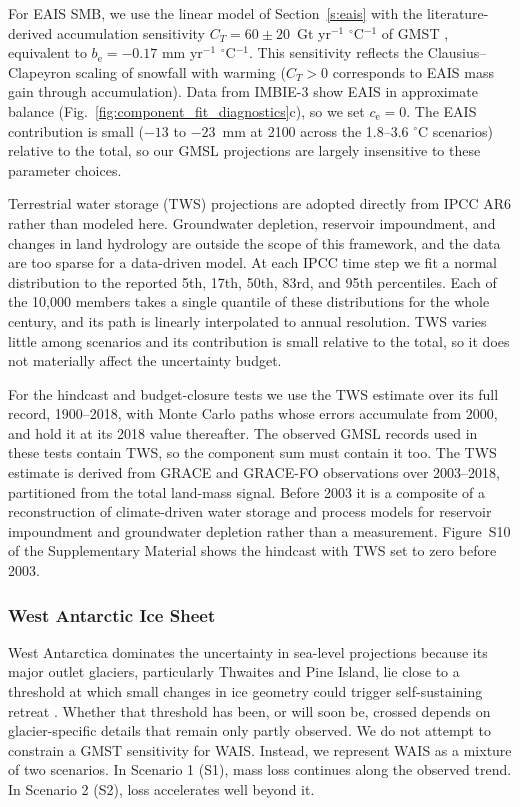 \documentclass[draft,linenumbers]{agujournal2025}
\begin{document}
For EAIS SMB, we use the linear model of Section~\ref{s:eais} with the literature-derived accumulation sensitivity $C_T = 60 \pm 20$~Gt yr$^{-1}$ $^\circ$C$^{-1}$ of GMST \citep{Frieler2015, Ligtenberg2013}, equivalent to $b_{\mathrm{e}} = -0.17$ mm yr$^{-1}$ $^\circ$C$^{-1}$. This sensitivity reflects the Clausius--Clapeyron scaling of snowfall with warming ($C_T > 0$ corresponds to EAIS mass gain through accumulation). Data from IMBIE-3 show EAIS in approximate balance (Fig.~\ref{fig:component_fit_diagnostics}c), so we set $c_{\mathrm{e}} = 0$. The EAIS contribution is small ($-13$ to $-23$~mm at 2100 across the 1.8--3.6 $^\circ$C scenarios) relative to the total, so our GMSL projections are largely insensitive to these parameter choices.

Terrestrial water storage (TWS) projections are adopted directly from IPCC AR6 rather than modeled here. Groundwater depletion, reservoir impoundment, and changes in land hydrology are outside the scope of this framework, and the data are too sparse for a data-driven model. At each IPCC time step we fit a normal distribution to the reported 5th, 17th, 50th, 83rd, and 95th percentiles. Each of the 10,000 members takes a single quantile of these distributions for the whole century, and its path is linearly interpolated to annual resolution. TWS varies little among scenarios and its contribution is small relative to the total, so it does not materially affect the uncertainty budget.

For the hindcast and budget-closure tests we use the \citet{Frederikse2020} TWS estimate over its full record, 1900--2018, with Monte Carlo paths whose errors accumulate from 2000, and hold it at its 2018 value thereafter. The observed GMSL records used in these tests contain TWS, so the component sum must contain it too. The TWS estimate is derived from GRACE and GRACE-FO observations over 2003--2018, partitioned from the total land-mass signal. Before 2003 it is a composite of a reconstruction of climate-driven water storage and process models for reservoir impoundment and groundwater depletion rather than a measurement. Figure~S10 of the Supplementary Material shows the hindcast with TWS set to zero before 2003.

\subsubsection{West Antarctic Ice Sheet}
\label{s:wais_forecast}

West Antarctica dominates the uncertainty in sea-level projections because its major outlet glaciers, particularly Thwaites and Pine Island, lie close to a threshold at which small changes in ice geometry could trigger self-sustaining retreat \citep{Joughin2014,PattynMorlighem2020,Fricker2025}. Whether that threshold has been, or will soon be, crossed depends on glacier-specific details that remain only partly observed. We do not attempt to constrain a GMST sensitivity for WAIS. Instead, we represent WAIS as a mixture of two scenarios. In Scenario 1 (S1), mass loss continues along the observed trend. In Scenario 2 (S2), loss accelerates well beyond it.
\end{document}
